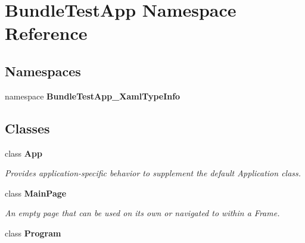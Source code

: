 \section{Bundle\+Test\+App Namespace Reference}
\label{namespace_bundle_test_app}
\subsection*{Namespaces}
\begin{DoxyCompactItemize}
\item 
namespace {\bf Bundle\+Test\+App\+\_\+\+Xaml\+Type\+Info}
\end{DoxyCompactItemize}
\subsection*{Classes}
\begin{DoxyCompactItemize}
\item 
class {\bf App}
\begin{DoxyCompactList}\small\item\em Provides application-\/specific behavior to supplement the default Application class. \end{DoxyCompactList}\item 
class {\bf Main\+Page}
\begin{DoxyCompactList}\small\item\em An empty page that can be used on its own or navigated to within a Frame. \end{DoxyCompactList}\item 
class {\bfseries Program}
\end{DoxyCompactItemize}
